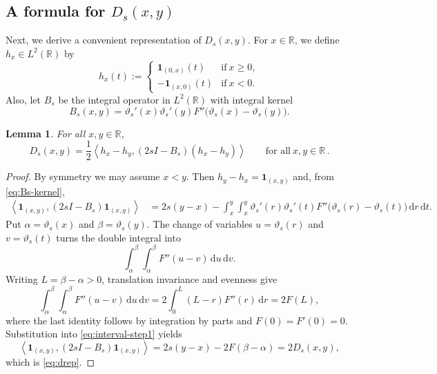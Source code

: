 \documentclass[10pt,a4paper]{amsart}
\newtheorem{lemma}[theorem]{Lemma}
\newcommand{\R}{\mathbb{R}}
\newcommand{\ip}[2]{\left\langle #1,#2\right\rangle}
\newcommand{\dd}{\,\mathrm{d}}
\begin{document}

\subsection*{A formula for $D_s(x,y)$}

Next, we derive a convenient representation of $D_s(x,y)$. For $x\in\R$, we define $h_x\in L^2(\R)$ by
\begin{equation}\label{eq:hx-def}
h_x(t):=
\begin{cases}
\mathbf 1_{(0,x)}(t)& \text{if}\ x\geq0,\\
-\mathbf 1_{(x,0)}(t)& \text{if}\ x<0.
\end{cases}
\end{equation}
Also, let $B_s$ be the integral operator in $L^2(\R)$ with integral kernel
\begin{equation}\label{eq:Bs-kernel}
B_s(x,y)=\vartheta_s'(x)\vartheta_s'(y)
F''\bigl(\vartheta_s(x)-\vartheta_s(y)\bigr).
\end{equation}

\begin{lemma}\label{lem:drep}
For all $x,y\in\R$,
\begin{equation}\label{eq:drep}
D_s(x,y)=\frac12\ip{h_x-h_y}{(2sI-B_s)(h_x-h_y)}
\qquad\text{for all}\ x,y\in\R \,.
\end{equation}
\end{lemma}

\begin{proof}
By symmetry we may assume $x<y$.  Then
$h_y-h_x=\mathbf 1_{(x,y)}$ and, from \eqref{eq:Bs-kernel},
\begin{align}
\ip{\mathbf 1_{(x,y)}}{(2sI-B_s)\mathbf 1_{(x,y)}}
&=2s(y-x)-\int_x^y\int_x^y
\vartheta_s'(r)\vartheta_s'(t)
F''\bigl(\vartheta_s(r)-\vartheta_s(t)\bigr)
\dd r\dd t.
\label{eq:interval-step1}
\end{align}
Put $\alpha=\vartheta_s(x)$ and $\beta=\vartheta_s(y)$.  The change
of variables $u=\vartheta_s(r)$ and $v=\vartheta_s(t)$ turns the
double integral into
\begin{equation}\label{eq:double-Fpp}
\int_\alpha^\beta\int_\alpha^\beta F''(u-v)\dd u\dd v.
\end{equation}
Writing $L=\beta-\alpha>0$, translation invariance and evenness give
\[
\int_\alpha^\beta\int_\alpha^\beta F''(u-v)\dd u\dd v
=2\int_0^L(L-r)F''(r)\dd r=2F(L),
\]
where the last identity follows by integration by parts and
$F(0)=F'(0)=0$.  Substitution into \eqref{eq:interval-step1} yields
\[
\ip{\mathbf 1_{(x,y)}}{(2sI-B_s)\mathbf 1_{(x,y)}}
=2s(y-x)-2F(\beta-\alpha)=2D_s(x,y),
\]
which is \eqref{eq:drep}.
\end{proof}
\end{document}
